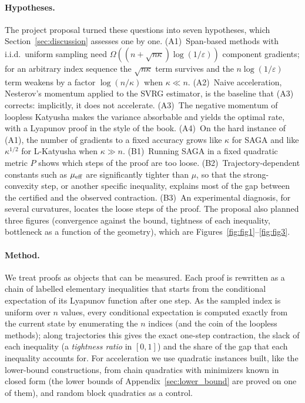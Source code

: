 \paragraph{Hypotheses.}
The project proposal turned these questions into seven hypotheses, which Section~\ref{sec:discussion} assesses one by
one. (A1)~Span-based methods with i.i.d.\ uniform sampling need $\Omega((n+\sqrt{n\kappa})\log(1/\varepsilon))$
component gradients; for an arbitrary index sequence the $\sqrt{n\kappa}$ term survives and the $n\log(1/\varepsilon)$
term weakens by a factor $\log(n/\kappa)$ when $\kappa\ll n$. (A2)~Naive acceleration, Nesterov's momentum applied to the
SVRG estimator, is the baseline that (A3) corrects: implicitly, it does not accelerate. (A3)~The negative momentum of
loopless Katyusha makes the variance absorbable and yields the optimal rate, with a Lyapunov proof in the style of the
book. (A4)~On the hard instance of (A1), the number of gradients to a fixed accuracy grows like $\kappa$ for SAGA and
like $\kappa^{1/2}$ for L-Katyusha when $\kappa\gg n$. (B1)~Running SAGA in a fixed quadratic metric $P$ shows which
steps of the proof are too loose. (B2)~Trajectory-dependent constants such as $\mu_{\mathrm{eff}}$ are significantly tighter than
$\mu$, so that the strong-convexity step, or another specific inequality, explains most of the gap between the certified
and the observed contraction. (B3)~An experimental diagnosis, for several curvatures, locates the loose steps of the
proof. The proposal also planned three figures (convergence against the bound, tightness of each inequality, bottleneck
as a function of the geometry), which are Figures~\ref{fig:fig1}--\ref{fig:fig3}.

\paragraph{Method.}
We treat proofs as objects that can be measured. Each proof is rewritten as a chain of labelled elementary
inequalities that starts from the conditional expectation of its Lyapunov function after one step. As the sampled
index is uniform over $n$ values, every conditional expectation is computed exactly from the current state by
enumerating the $n$ indices (and the coin of the loopless methods); along trajectories this gives the exact one-step
contraction, the slack of each inequality (a \emph{tightness ratio} in $[0,1]$) and the share of the gap that each
inequality accounts for. For acceleration we use quadratic instances built, like the lower-bound constructions, from
chain quadratics with minimizers known in closed form (the lower bounds of Appendix~\ref{sec:lower_bound} are proved
on one of them), and random block quadratics as a control.

